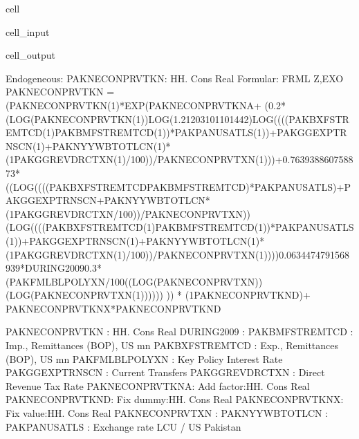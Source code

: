 \documentclass[letterpaper,10pt,english]{jupyterBook}
\begin{document}
\begin{sphinxuseclass}{cell}\begin{sphinxVerbatimInput}

\begin{sphinxuseclass}{cell_input}
\begin{sphinxVerbatim}[commandchars=\\\{\}]
\PYG{p}{[}\PYG{p}{]}
\end{sphinxVerbatim}

\end{sphinxuseclass}\end{sphinxVerbatimInput}
\begin{sphinxVerbatimOutput}

\begin{sphinxuseclass}{cell_output}
\begin{sphinxVerbatim}[commandchars=\\\{\}]
Endogeneous: PAKNECONPRVTKN: HH. Cons Real
Formular: FRML \PYGZlt{}Z,EXO\PYGZgt{} PAKNECONPRVTKN = (PAKNECONPRVTKN(\PYGZhy{}1)*EXP(PAKNECONPRVTKN\PYGZus{}A+ (\PYGZhy{}0.2*(LOG(PAKNECONPRVTKN(\PYGZhy{}1))\PYGZhy{}LOG(1.21203101101442)\PYGZhy{}LOG((((PAKBXFSTREMTCD(\PYGZhy{}1)\PYGZhy{}PAKBMFSTREMTCD(\PYGZhy{}1))*PAKPANUSATLS(\PYGZhy{}1))+PAKGGEXPTRNSCN(\PYGZhy{}1)+PAKNYYWBTOTLCN(\PYGZhy{}1)*(1\PYGZhy{}PAKGGREVDRCTXN(\PYGZhy{}1)/100))/PAKNECONPRVTXN(\PYGZhy{}1)))+0.763938860758873*((LOG((((PAKBXFSTREMTCD\PYGZhy{}PAKBMFSTREMTCD)*PAKPANUSATLS)+PAKGGEXPTRNSCN+PAKNYYWBTOTLCN*(1\PYGZhy{}PAKGGREVDRCTXN/100))/PAKNECONPRVTXN))\PYGZhy{}(LOG((((PAKBXFSTREMTCD(\PYGZhy{}1)\PYGZhy{}PAKBMFSTREMTCD(\PYGZhy{}1))*PAKPANUSATLS(\PYGZhy{}1))+PAKGGEXPTRNSCN(\PYGZhy{}1)+PAKNYYWBTOTLCN(\PYGZhy{}1)*(1\PYGZhy{}PAKGGREVDRCTXN(\PYGZhy{}1)/100))/PAKNECONPRVTXN(\PYGZhy{}1))))\PYGZhy{}0.0634474791568939*DURING\PYGZus{}2009\PYGZhy{}0.3*(PAKFMLBLPOLYXN/100\PYGZhy{}((LOG(PAKNECONPRVTXN))\PYGZhy{}(LOG(PAKNECONPRVTXN(\PYGZhy{}1)))))) )) * (1\PYGZhy{}PAKNECONPRVTKN\PYGZus{}D)+ PAKNECONPRVTKN\PYGZus{}X*PAKNECONPRVTKN\PYGZus{}D  \PYGZdl{}

PAKNECONPRVTKN  : HH. Cons Real
DURING\PYGZus{}2009     : 
PAKBMFSTREMTCD  : Imp., Remittances (BOP), US\PYGZdl{} mn
PAKBXFSTREMTCD  : Exp., Remittances (BOP), US\PYGZdl{} mn
PAKFMLBLPOLYXN  : Key Policy Interest Rate
PAKGGEXPTRNSCN  : Current Transfers
PAKGGREVDRCTXN  : Direct Revenue Tax Rate
PAKNECONPRVTKN\PYGZus{}A: Add factor:HH. Cons Real
PAKNECONPRVTKN\PYGZus{}D: Fix dummy:HH. Cons Real
PAKNECONPRVTKN\PYGZus{}X: Fix value:HH. Cons Real
PAKNECONPRVTXN  : 
PAKNYYWBTOTLCN  : 
PAKPANUSATLS    : Exchange rate LCU / US\PYGZdl{} \PYGZhy{} Pakistan
\end{sphinxVerbatim}


\end{sphinxuseclass}
\end{sphinxVerbatimOutput}
\end{sphinxuseclass}
\end{document}
